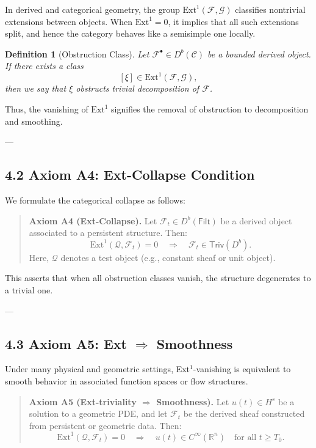 \documentclass[11pt]{article}
\newtheorem{definition}[theorem]{Definition}
\begin{document}
In derived and categorical geometry, the group \( \mathrm{Ext}^1(\mathcal{F}, \mathcal{G}) \) classifies  
nontrivial extensions between objects. When \( \mathrm{Ext}^1 = 0 \), it implies that all such extensions  
split, and hence the category behaves like a semisimple one locally.

\begin{definition}[Obstruction Class]
Let \( \mathcal{F}^\bullet \in D^b(\mathcal{C}) \) be a bounded derived object.  
If there exists a class
\[
[\xi] \in \mathrm{Ext}^1(\mathcal{F}, \mathcal{G}),
\]
then we say that \( \xi \) obstructs trivial decomposition of \( \mathcal{F} \).
\end{definition}

Thus, the vanishing of \( \mathrm{Ext}^1 \) signifies the removal of obstruction to decomposition and smoothing.

---

\subsection*{4.2 Axiom A4: Ext-Collapse Condition}

We formulate the categorical collapse as follows:

\begin{quote}
\textbf{Axiom A4 (Ext-Collapse).}  
Let \( \mathcal{F}_t \in D^b(\mathsf{Filt}) \) be a derived object associated to a persistent structure.  
Then:
\[
\mathrm{Ext}^1(\mathcal{Q}, \mathcal{F}_t) = 0 
\quad \Longrightarrow \quad 
\mathcal{F}_t \in \mathsf{Triv}(D^b).
\]
Here, \( \mathcal{Q} \) denotes a test object (e.g., constant sheaf or unit object).
\end{quote}

This asserts that when all obstruction classes vanish, the structure degenerates to a trivial one.

---

\subsection*{4.3 Axiom A5: Ext $\Rightarrow$ Smoothness}

Under many physical and geometric settings, Ext$^1$-vanishing is equivalent to smooth behavior  
in associated function spaces or flow structures.

\begin{quote}
\textbf{Axiom A5 (Ext-triviality $\Rightarrow$ Smoothness).}  
Let \( u(t) \in H^s \) be a solution to a geometric PDE, and let \( \mathcal{F}_t \)  
be the derived sheaf constructed from persistent or geometric data. Then:
\[
\mathrm{Ext}^1(\mathcal{Q}, \mathcal{F}_t) = 0 
\quad \Longrightarrow \quad 
u(t) \in C^\infty(\mathbb{R}^n) \quad \text{for all } t \geq T_0.
\]
\end{quote}
\end{document}
